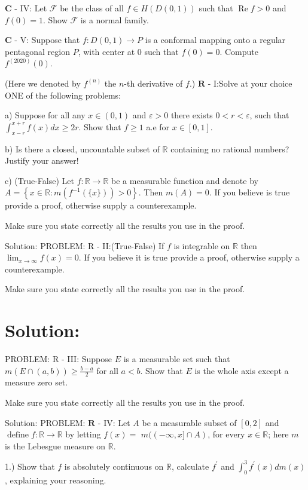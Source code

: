 \documentclass[10pt]{article}
\begin{document}
$\mathbf{C}$ - IV: Let $\mathcal{F}$ be the class of all $f \in H(D(0,1))$ such that $\operatorname{Re} f>0$ and $f(0)=1$. Show $\mathcal{F}$ is a normal family.

$\mathbf{C}$ - V: Suppose that $f: D(0,1) \rightarrow P$ is a conformal mapping onto a regular pentagonal region $P$, with center at 0 such that $f(0)=0$. Compute $f^{(2020)}(0)$.

(Here we denoted by $f^{(n)}$ the $n$-th derivative of $f$.) $\mathbf{R}$ - I:Solve at your choice ONE of the following problems:

a) Suppose for all any $x \in(0,1)$ and $\varepsilon>0$ there exists $0<r<\varepsilon$, such that $\int_{x-r}^{x+r} f(x) d x \geq 2 r$. Show that $f \geq 1$ a.e for $x \in[0,1]$.

b) Is there a closed, uncountable subset of $\mathbb{R}$ containing no rational numbers? Justify your answer!

c) (True-False) Let $f: \mathbb{R} \rightarrow \mathbb{R}$ be a measurable function and denote by $A=\left\{x \in \mathbb{R}: m\left(f^{-1}(\{x\})\right)>0\right\}$. Then $m(A)=0$. If you believe is true provide a proof, otherwise supply a counterexample.

Make sure you state correctly all the results you use in the proof.

Solution: PROBLEM: R - II:(True-False) If $f$ is integrable on $\mathbb{R}$ then $\lim _{x \rightarrow \infty} f(x)=0$. If you believe it is true provide a proof, otherwise supply a counterexample.

Make sure you state correctly all the results you use in the proof.

\section{Solution:}
PROBLEM: R - III: Suppose $E$ is a measurable set such that $m(E \cap(a, b)) \geq \frac{b-a}{2}$ for all $a<b$. Show that $E$ is the whole axis except a measure zero set.

Make sure you state correctly all the results you use in the proof.

Solution: PROBLEM: $\mathbf{R}$ - IV: Let $A$ be a measurable subset of $[0,2]$ and $\operatorname{define} f: \mathbb{R} \rightarrow \mathbb{R}$ by letting $f(x)=$ $m((-\infty, x] \cap A)$, for every $x \in \mathbb{R}$; here $m$ is the Lebesgue measure on $\mathbb{R}$.

1.) Show that $f$ is absolutely continuous on $\mathbb{R}$, calculate $f^{\prime}$ and $\int_{0}^{3} f^{\prime}(x) d m(x)$, explaining your reasoning.
\end{document}
